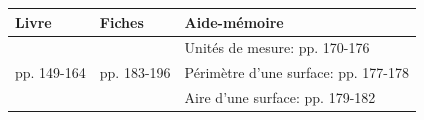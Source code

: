 

\def\arraystretch{1.2}
\begin{tabularx}{\linewidth}{|>{\centering\arraybackslash}p{3cm}|>{\centering\arraybackslash}p{3cm}|X|}
\hline
\cellcolor{themeColor!30} Livre & \cellcolor{themeColor!30} Fiches & \cellcolor{themeColor!30} \hfill Aide-mémoire\hfill\null\\
\hline
&&Unités de mesure: pp. 170-176\\
pp. 149-164&pp. 183-196&Périmètre d'une surface: pp. 177-178\\
&&Aire d'une surface: pp. 179-182\\
\hline
\end{tabularx}
\def\arraystretch{1}

